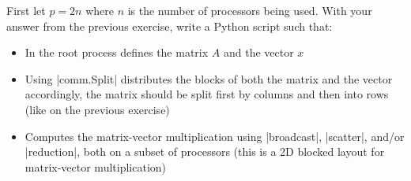 \documentclass[11pt]{article}
\begin{document}
First let $p = 2n$ where $n$ is the number of processors being used. With your answer from the previous exercise, write a Python script such that:

\begin{itemize}
   \item In the root process defines the matrix $A$ and the vector $x$
   \item Using |comm.Split| distributes the blocks of both the matrix and the vector accordingly, the matrix should be split first by columns and then into rows (like on the previous exercise)
   \item Computes the matrix-vector multiplication using |broadcast|, |scatter|, and/or |reduction|, both on a subset of processors (this is a 2D blocked layout for matrix-vector multiplication)
\end{itemize}


\end{document}
